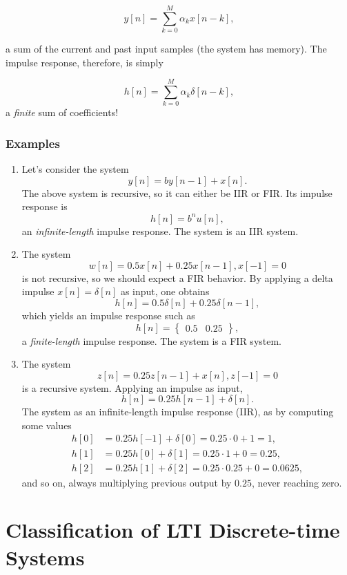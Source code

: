 \documentclass[\documentfontsize, twocolumn]{\classname}
\begin{document}
\[
	y[n] = \sum_{k=0}^M \alpha_k x[n - k],
\]

a sum of the current and past input samples (the system has memory). The
impulse response, therefore, is simply

\begin{equation}\label{eqn:finiteDimensionalLtiSystemsRecursiveImpulseResponse}
	h[n] = \sum_{k=0}^M \alpha_k \delta[n - k],
\end{equation}
a \emph{finite} sum of coefficients!

\subsubsection{Examples}

\begin{enumerate}
	\item Let's consider the system \[ y[n] = by[n-1] + x[n]. \] The above
		system is recursive, so it can either be IIR or FIR. Its impulse response is
		\[ h[n] = b^n u[n], \]
		an \emph{infinite-length} impulse response. The system is an IIR system.
	\item The system \[ w[n] = 0.5x[n] + 0.25 x[n-1], x[-1]=0 \] is not
		recursive, so we should expect a FIR behavior. By applying a
		delta impulse $x[n] = \delta[n]$ as input, one obtains
		\[
			h[n] = 0.5\delta[n] + 0.25\delta[n-1],
		\]
		which yields an impulse response such as
		\[
			h[n] = \begin{Bmatrix} 0.5 & 0.25 \end{Bmatrix},
		\]
		a \emph{finite-length} impulse response. The system is a FIR
		system.
	\item The system \[ z[n] = 0.25z[n-1] + x[n], z[-1] = 0 \] is a
		recursive system. Applying an impulse as input,
		\[
			h[n] = 0.25h[n-1] + \delta[n].
		\]
		The system as an infinite-length impulse response (IIR), as by
		computing some values
		\begin{align*}
			h[0] &= 0.25 h[-1] + \delta[0] = 0.25\cdot 0 + 1 = 1,\\
			h[1] &= 0.25 h[0] + \delta[1] = 0.25\cdot 1 + 0 = 0.25,\\
			h[2] &= 0.25 h[1] + \delta[2] = 0.25\cdot 0.25 + 0 = 0.0625,
		\end{align*}
		and so on, always multiplying previous output by $0.25$, never
		reaching zero.

\end{enumerate}

\section{Classification of LTI Discrete-time Systems}
\end{document}
